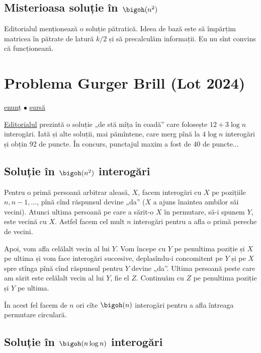 \subsection{Misterioasa soluție în \texorpdfstring{$\bigoh(n^2)$}{O(n2)}}

Editorialul menționează o soluție pătratică. Ideea de bază este să împărțim matricea în pătrate de latură $k / 2$ și să precalculăm informații. Eu nu sînt convins că funcționează.


\section{Problema Gurger Brill (Lot 2024)}
\label{problem:gurger-brill}

\href{https://kilonova.ro/problems/2831}{enunț}
$\bullet$
\hyperref[code:gurger-brill]{sursă}

\href{https://github.com/roalgo-discord/Romanian-Olympiad-Solutions/blob/main/Baraj\%20\%2B\%20Lot\%20Seniori\%20(IOI\%20team\%20selection\%20tests)/2024/Lot\%203\%20Seniori\%202024.pdf}{Editorialul} prezintă o soluție „de stă mîța în coadă” care folosește $12 + 3 \log n$ interogări. Iată și alte soluții, mai pămîntene, care merg pînă la $4 \log n$ interogări și obțin 92 de puncte. În concurs, punctajul maxim a fost de 40 de puncte...

\subsection{Soluție în \texorpdfstring{$\bigoh(n^2)$}{O(n2)} interogări}

Pentru o primă persoană arbitrar aleasă, $X$, facem interogări cu $X$ pe pozițiile $n, n-1, \dots$, pînă cînd răspunsul devine „da” ($X$ a ajuns înaintea ambilor săi vecini). Atunci ultima persoană pe care a sărit-o $X$ în permutare, să-i spunem $Y$, este vecină cu $X$. Astfel facem cel mult $n$ interogări pentru a afla o primă pereche de vecini.

Apoi, vom afla celălalt vecin al lui $Y$. Vom începe cu $Y$ pe penultima poziție și $X$ pe ultima și vom face interogări succesive, deplasîndu-i concomitent pe $Y$ și pe $X$ spre stînga pînă cînd răspunsul pentru $Y$ devine „da”. Ultima persoană peste care am sărit este celălalt vecin al lui $Y$, fie el $Z$. Continuăm cu $Z$ pe penultima poziție și $Y$ pe ultima.

În acest fel facem de $n$ ori cîte $\bigoh(n)$ interogări pentru a afla întreaga permutare circulară.

\subsection{Soluție în \texorpdfstring{$\bigoh(n \log n)$}{O(n log n)} interogări}

